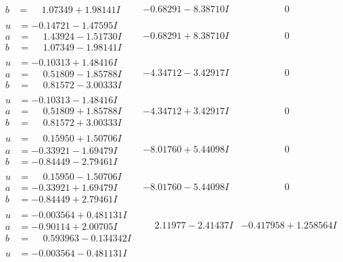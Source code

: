 \documentclass[1p]{elsarticle_modified}
\theoremstyle{definition}
\begin{document}
$$\begin{array}{c|c|c}
\begin{aligned}
b &= \phantom{-}1.07349 + 1.98141 I\end{aligned}
 & -0.68291 - 8.38710 I & \phantom{-0.000000 } 0 \\ \hline\begin{aligned}
u &= -0.14721 - 1.47595 I \\
a &= \phantom{-}1.43924 - 1.51730 I \\
b &= \phantom{-}1.07349 - 1.98141 I\end{aligned}
 & -0.68291 + 8.38710 I & \phantom{-0.000000 } 0 \\ \hline\begin{aligned}
u &= -0.10313 + 1.48416 I \\
a &= \phantom{-}0.51809 - 1.85788 I \\
b &= \phantom{-}0.81572 - 3.00333 I\end{aligned}
 & -4.34712 - 3.42917 I & \phantom{-0.000000 } 0 \\ \hline\begin{aligned}
u &= -0.10313 - 1.48416 I \\
a &= \phantom{-}0.51809 + 1.85788 I \\
b &= \phantom{-}0.81572 + 3.00333 I\end{aligned}
 & -4.34712 + 3.42917 I & \phantom{-0.000000 } 0 \\ \hline\begin{aligned}
u &= \phantom{-}0.15950 + 1.50706 I \\
a &= -0.33921 - 1.69479 I \\
b &= -0.84449 - 2.79461 I\end{aligned}
 & -8.01760 + 5.44098 I & \phantom{-0.000000 } 0 \\ \hline\begin{aligned}
u &= \phantom{-}0.15950 - 1.50706 I \\
a &= -0.33921 + 1.69479 I \\
b &= -0.84449 + 2.79461 I\end{aligned}
 & -8.01760 - 5.44098 I & \phantom{-0.000000 } 0 \\ \hline\begin{aligned}
u &= -0.003564 + 0.481131 I \\
a &= -0.90114 + 2.00705 I \\
b &= \phantom{-}0.593963 - 0.134342 I\end{aligned}
 & \phantom{-}2.11977 - 2.41437 I & -0.417958 + 1.258564 I \\ \hline\begin{aligned}
u &= -0.003564 - 0.481131 I \\

\end{aligned}
\end{array}$$
\end{document}
